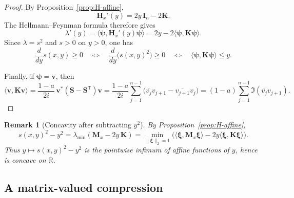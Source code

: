 \documentclass[11pt]{article}
\newtheorem{remark}[theorem]{Remark}
\begin{document}
\begin{proof}
By Proposition~\ref{prop:H-affine},
\[
\mathbf H_x'(y)=2y\,\mathbf I_n-2\mathbf K.
\]
The Hellmann--Feynman formula therefore gives
\[
\lambda'(y)=\langle \boldsymbol{\psi},\mathbf H_x'(y)\boldsymbol{\psi}\rangle
=
2y-2\langle \boldsymbol{\psi},\mathbf K\boldsymbol{\psi}\rangle.
\]
Since \(\lambda=s^2\) and \(s>0\) on \(y>0\), one has
\[
\frac{d}{dy}s(x,y)\ge 0
\quad\Longleftrightarrow\quad
\frac{d}{dy}\bigl(s(x,y)^2\bigr)\ge 0
\quad\Longleftrightarrow\quad
\langle \boldsymbol{\psi},\mathbf K\boldsymbol{\psi}\rangle\le y.
\]

Finally, if \(\boldsymbol{\psi}=\mathbf v\), then
\[
\langle \mathbf v,\mathbf K\mathbf v\rangle
=
\frac{1-a}{2i}\,\mathbf v^*(\mathbf S-\mathbf S^{\mathsf T})\mathbf v
=
\frac{1-a}{2i}\sum_{j=1}^{n-1}\bigl(\overline{v_j}v_{j+1}-\overline{v_{j+1}}v_j\bigr)
=
(1-a)\sum_{j=1}^{n-1}\Im(\overline{v_j}v_{j+1}).
\]
\end{proof}

\begin{remark}[Concavity after subtracting \(y^2\)]\label{rem:concavity}
By Proposition~\ref{prop:H-affine},
\[
s(x,y)^2-y^2
=
\lambda_{\min}(\mathbf M_x-2y\,\mathbf K)
=
\min_{\|\boldsymbol{\xi}\|_2=1}\bigl(\langle \boldsymbol{\xi},\mathbf M_x\boldsymbol{\xi}\rangle-2y\langle \boldsymbol{\xi},\mathbf K\boldsymbol{\xi}\rangle\bigr).
\]
Thus \(y\mapsto s(x,y)^2-y^2\) is the pointwise infimum of affine functions of \(y\), hence is concave on \(\mathbb R\).
\end{remark}

\subsection*{A matrix-valued compression}
\end{document}
